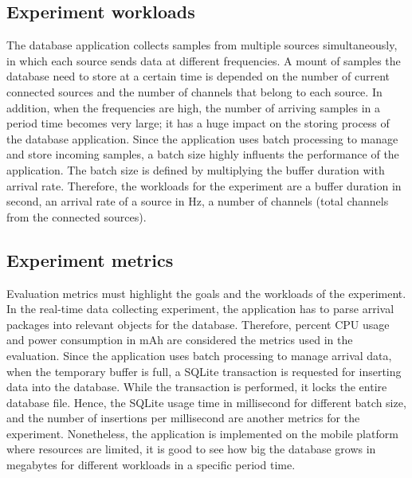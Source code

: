 \subsection{Experiment workloads}
The database application collects samples from multiple sources simultaneously, in which each source sends data at different frequencies. A mount of samples the database need to store at a certain time is depended on the number of current connected sources and the number of channels that belong to each source. In addition, when the frequencies are high, the number of arriving samples in a period time becomes very large; it has a huge impact on the storing process of the database application. Since the application uses batch processing to manage and store incoming samples, a batch size highly influents the performance of the application. The batch size is defined by multiplying the buffer duration with arrival rate. Therefore, the workloads for the experiment are a buffer duration in second, an arrival rate of a source in Hz, a number of channels (total channels from the connected sources).
\subsection{Experiment metrics}
Evaluation metrics must highlight the goals and the workloads of the experiment. In the real-time data collecting experiment, the application has to parse arrival packages into relevant objects for the database. Therefore, percent CPU usage and power consumption in mAh are considered the metrics used in the evaluation. Since the application uses batch processing to manage arrival data, when the temporary buffer is full, a SQLite transaction is requested for inserting data into the database. While the transaction is performed, it locks the entire database file. Hence, the SQLite usage time in millisecond for different batch size, and the number of insertions per millisecond are another metrics for the experiment. Nonetheless, the application is implemented on the mobile platform where resources are limited, it is good to see how big the database grows in megabytes for different workloads in a specific period time.
